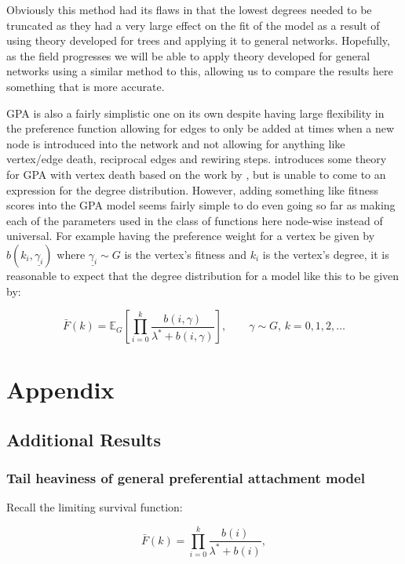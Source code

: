 \documentclass[
  sn-basic,
]{sn-jnl}
\theoremstyle{plain}
\theoremstyle{remark}
\begin{document}
Obviously this method had its flaws in that the lowest degrees needed to
be truncated as they had a very large effect on the fit of the model as
a result of using theory developed for trees and applying it to general
networks. Hopefully, as the field progresses we will be able to apply
theory developed for general networks using a similar method to this,
allowing us to compare the results here something that is more accurate.

GPA is also a fairly simplistic one on its own despite having large
flexibility in the preference function allowing for edges to only be
added at times when a new node is introduced into the network and not
allowing for anything like vertex/edge death, reciprocal edges and
rewiring steps. \citep{deijfen2015} introduces some theory for GPA with
vertex death based on the work by \citep{rudas07}, but is unable to come
to an expression for the degree distribution. However, adding something
like fitness scores into the GPA model seems fairly simple to do even
going so far as making each of the parameters used in the class of
functions here node-wise instead of universal. For example having the
preference weight for a vertex be given by
\(b(k_i, \underline{\gamma_i})\) where \(\underline{\gamma_i}\sim G\) is
the vertex's fitness and \(k_i\) is the vertex's degree, it is
reasonable to expect that the degree distribution for a model like this
to be given by:

\[
\bar F(k) = \mathbb E_G\left[\prod_{i=0}^k \frac{b(i, \gamma)}{\lambda^* + b(i,\gamma)}\right],\qquad \gamma\sim G,\, k=0,1,2,\ldots
\]

\section{Appendix}\label{appendix}

\subsection{Additional Results}\label{additional-results}

\subsubsection{Tail heaviness of general preferential attachment
model}\label{tail-heaviness-of-general-preferential-attachment-model}

Recall the limiting survival function:

\[
\bar F(k) = \prod_{i=0}^k \frac{b(i)}{\lambda^*+b(i)},
\]
\end{document}
